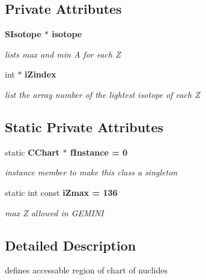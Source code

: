 \subsection*{Private Attributes}
\begin{CompactItemize}
\item 
\bf{SIsotope} $\ast$ \bf{isotope}\label{classCChart_b078bb8c0ccd761e510a2a089d07a6b1}

\begin{CompactList}\small\item\em lists max and min A for each Z \item\end{CompactList}\item 
int $\ast$ \bf{i\-Zindex}\label{classCChart_ed688736582efc7b865923a72c02e71e}

\begin{CompactList}\small\item\em list the array number of the lightest isotope of each Z \item\end{CompactList}\end{CompactItemize}
\subsection*{Static Private Attributes}
\begin{CompactItemize}
\item 
static \bf{CChart} $\ast$ \bf{f\-Instance} = 0\label{classCChart_81924abfc27faacf471a13430f0013df}

\begin{CompactList}\small\item\em instance member to make this class a singleton \item\end{CompactList}\item 
static int const \bf{i\-Zmax} = 136\label{classCChart_2ae54c9323a890abd5e496e42a1332ec}

\begin{CompactList}\small\item\em max Z allowed in GEMINI \item\end{CompactList}\end{CompactItemize}


\subsection{Detailed Description}
defines accessable region of chart of nuclides 

